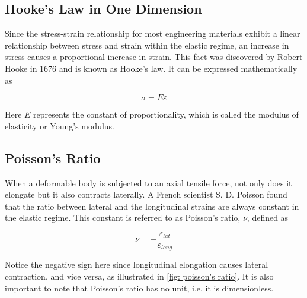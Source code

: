 \documentclass[
10pt,
a4paper,
openany,
svgnames,
]{book} %
\begin{document}
\subsection{Hooke’s Law in One Dimension}

Since the stress-strain relationship for most engineering materials exhibit a linear relationship between stress and strain within the elastic regime, an increase in stress causes a proportional increase in strain. This fact was discovered by Robert Hooke in 1676 and is known as Hooke’s law. It can be expressed mathematically as

\begin{equation}
  \sigma  = E\varepsilon
\end{equation}

Here $E$ represents the constant of proportionality, which is called the modulus of elasticity or Young’s modulus.

\subsection{Poisson’s Ratio}

When a deformable body is subjected to an axial tensile force, not only does it elongate but it also contracts laterally. A French scientist S. D. Poisson found that the ratio between lateral and the longitudinal strains are always constant in the elastic regime. This constant is referred to as Poisson’s ratio, $\nu$, defined as

\begin{equation}
  \nu  =  - \frac{\varepsilon _{lat}}{\varepsilon _{long}}
\end{equation}
  
Notice the negative sign here since longitudinal elongation causes lateral contraction, and vice versa, as illustrated in \cref{fig: poisson's ratio}. It is also important to note that Poisson’s ratio has no unit, i.e. it is dimensionless. 
\end{document}
